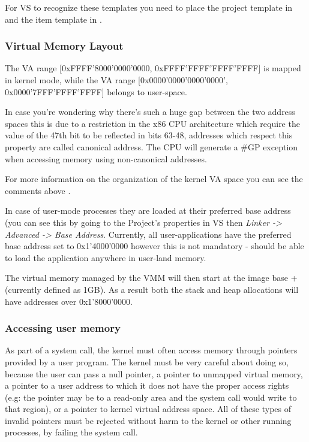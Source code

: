 For VS to recognize these templates you need to place the project template in  and the item template in .

\subsubsection{Virtual Memory Layout}
\label{sect:VirtMemLayout}

The VA range [0xFFFF'8000'0000'0000, 0xFFFF'FFFF'FFFF'FFFF] is mapped in kernel mode, while the
VA range [0x0000'0000'0000'0000', 0x0000'7FFF'FFFF'FFFF] belongs to user-space.

In case you're wondering why there's such a huge gap between the two address spaces this is due to a
restriction in the x86 CPU architecture which require the value of the 47th bit to be reflected in
bits 63-48, addresses which respect this property are called canonical address. The CPU will
generate a \#GP exception when accessing memory using non-canonical addresses.

For more information on the organization of the kernel VA space you can see the comments above
.

In case of user-mode processes they are loaded at their preferred base address (you can see this by
going to the Project's properties in VS then \textit{Linker -> Advanced -> Base Address}. Currently,
all \projectname user-applications have the preferred base address set to 0x1'4000'0000 however this
is not mandatory - \projectname should be able to load the application anywhere in user-land memory.

The virtual memory managed by the VMM will then start at the image base +
(currently defined as 1GB). As a result both the stack and heap allocations will have addresses over
0x1'8000'0000.

\subsubsection{Accessing user memory}

As part of a system call, the kernel must often access memory through pointers provided by a user
program. The kernel must be very careful about doing so, because the user can pass a null pointer,
a pointer to unmapped virtual memory, a pointer to a user address to which it does not have the
proper access rights (e.g: the pointer may be to a read-only area and the system call would write to
that region), or a pointer to kernel virtual address space. All of these types of invalid pointers
must be rejected without harm to the kernel or other running processes, by failing the system call.

